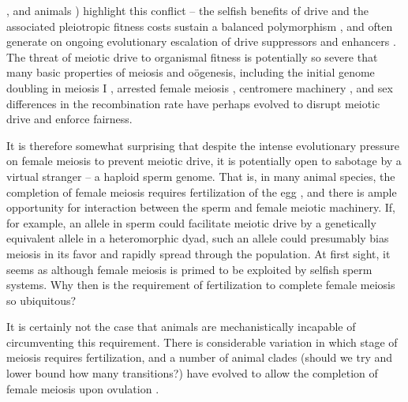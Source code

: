 \documentclass[12pt,letterpaper]{article}
\begin{document}
\citep{Buckler1999,Fishman2005,Fishman2008}, and animals
\citep{Agulnik1990,Wu2005,Pardo-ManuelDeVillena2001c}) highlight this
conflict -- the selfish benefits of drive and the associated
pleiotropic fitness costs sustain a balanced polymorphism
\citep{Prout1973}, 
and often generate on ongoing evolutionary escalation of drive suppressors and enhancers \citep{Dawe1996,Fishman2008}. 
The threat of meiotic drive to organismal fitness is potentially so
severe that many basic properties of
meiosis and o\"{o}genesis, including the initial genome doubling in
meiosis I \citep{Haig1991}, arrested female meiosis
\citep{Mira1998}, centromere machinery \citep{MalikHenikoff}, and sex differences in the recombination rate \citep{Haig2010,Brandvain2012} 
have perhaps evolved to disrupt meiotic drive and enforce fairness. 

It is therefore somewhat surprising that despite the intense evolutionary pressure on female meiosis to prevent meiotic drive, 
it is potentially open to sabotage by a virtual stranger -- a haploid sperm genome.
That is, in many animal species, the completion of female meiosis requires fertilization of the egg \citep{Masui_book}, 
and there is ample opportunity for interaction between the sperm and female meiotic machinery.
If, for example, an allele in sperm could facilitate meiotic drive by a genetically equivalent allele in a 
heteromorphic dyad, such an allele could presumably bias meiosis in its favor and rapidly spread through the population.
At first sight, it seems as although female meiosis is primed to be exploited by selfish sperm systems.  
Why then is the requirement of fertilization to complete female meiosis so ubiquitous? 

It is certainly not the case that animals are mechanistically incapable of circumventing this requirement.
There is considerable variation in which stage of meiosis requires fertilization, and 
a number of animal clades (should we try and lower bound how many transitions?) have evolved
to allow the completion of female meiosis upon ovulation \citep[see
Table 1 of ][]{Masui_book}. 
\end{document}
